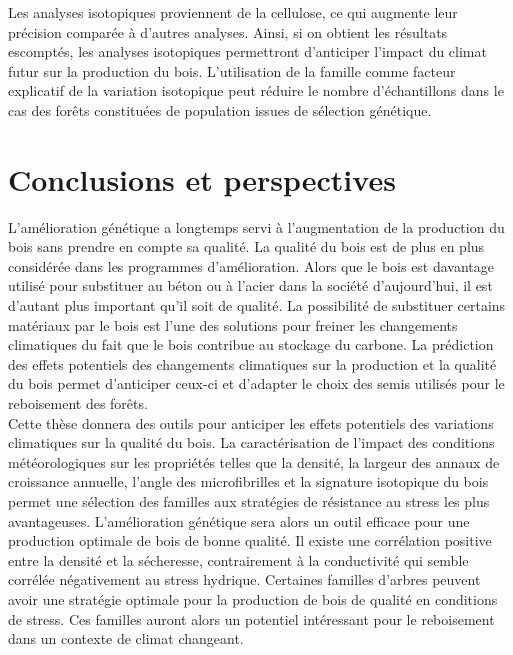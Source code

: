 \documentclass[a4paper,12pt]{report}
\begin{document}
Les analyses isotopiques proviennent de la cellulose, ce qui augmente leur précision comparée à d'autres analyses. Ainsi, si on obtient les résultats escomptés, les analyses isotopiques permettront d'anticiper l'impact du climat futur sur la production du bois. L'utilisation de la famille comme facteur explicatif de la variation isotopique peut réduire le nombre d'échantillons dans le cas des forêts constituées de population issues de sélection génétique. %

\clearpage %

\chapter*{Conclusions et perspectives}

L'amélioration génétique a longtemps servi à l'augmentation de la production du bois sans prendre en compte sa qualité. La qualité du bois est de plus en plus considérée dans les programmes d'amélioration. Alors que le bois est davantage utilisé pour substituer au  béton ou à l'acier dans la société d'aujourd'hui, il est d'autant plus important qu'il soit de qualité. La possibilité de substituer certains matériaux par le bois est l'une des solutions pour freiner les changements climatiques du fait que le bois contribue au stockage du carbone. La prédiction des effets potentiels des changements climatiques sur la production et la qualité du bois permet d'anticiper ceux-ci et d'adapter le choix des semis utilisés pour le reboisement des forêts. \\

Cette thèse donnera des outils pour anticiper les effets potentiels des variations climatiques sur la qualité du bois. La caractérisation de l'impact des conditions météorologiques sur les propriétés telles que la densité, la largeur des annaux de croissance annuelle, l'angle des microfibrilles et la signature isotopique du bois permet une sélection des familles aux stratégies de résistance au stress les plus avantageuses. L'amélioration génétique sera alors un outil efficace pour une production optimale de bois de bonne qualité. Il existe une corrélation positive entre la densité et la sécheresse, contrairement à la conductivité qui semble corrélée négativement au stress hydrique. Certaines familles d'arbres peuvent avoir une stratégie optimale pour la production de bois de qualité en conditions de stress. Ces familles auront alors un potentiel intéressant pour le reboisement dans un contexte de climat changeant. \\
\end{document}
